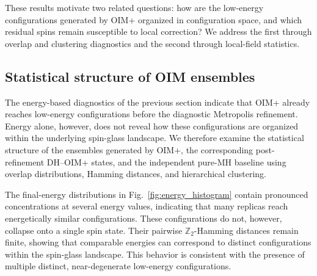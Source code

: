 \documentclass[
reprint,
amsmath,amssymb,
aps,
pre,
floatfix,
]{revtex4-2}
\begin{document}
These results motivate two related questions: how are the low-energy
configurations generated by OIM+ organized in configuration space, and which
residual spins remain susceptible to local correction? We address the first
through overlap and clustering diagnostics and the second through local-field
statistics.

\subsection{Statistical structure of OIM ensembles}

The energy-based diagnostics of the previous section indicate that OIM+
already reaches low-energy configurations before the diagnostic
Metropolis refinement. Energy alone, however, does not reveal how these
configurations are organized within the underlying spin-glass landscape.
We therefore examine the statistical structure of the ensembles generated
by OIM+, the corresponding post-refinement DH--OIM+ states, and the
independent pure-MH baseline using overlap distributions, Hamming
distances, and hierarchical clustering.

The final-energy distributions in Fig.~\ref{fig:energy_histogram} contain
pronounced concentrations at several energy values, indicating that many
replicas reach energetically similar configurations. These configurations
do not, however, collapse onto a single spin state. Their pairwise $\mathbb{Z}_2$-Hamming
distances remain finite, showing that comparable energies can correspond
to distinct configurations within the spin-glass landscape.
This behavior
is consistent with the presence of multiple distinct, near-degenerate
low-energy configurations.
\end{document}
